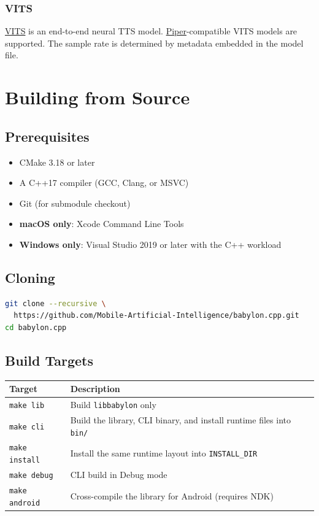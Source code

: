 \documentclass[12pt,a4paper]{article}
\begin{document}
\subsubsection{VITS}

\href{https://github.com/jaywalnut310/vits}{VITS} is an end-to-end neural TTS model. \href{https://github.com/rhasspy/piper}{Piper}-compatible VITS models are supported. The sample rate is determined by metadata embedded in the model file.

\section{Building from Source}
\label{sec:building}

\subsection{Prerequisites}

\begin{itemize}[noitemsep]
    \item CMake 3.18 or later
    \item A C++17 compiler (GCC, Clang, or MSVC)
    \item Git (for submodule checkout)
    \item \textbf{macOS only}: Xcode Command Line Tools
    \item \textbf{Windows only}: Visual Studio 2019 or later with the C++ workload
\end{itemize}

\subsection{Cloning}

\begin{lstlisting}[language=bash]
git clone --recursive \
  https://github.com/Mobile-Artificial-Intelligence/babylon.cpp.git
cd babylon.cpp
\end{lstlisting}

\subsection{Build Targets}

\begin{center}
\begin{tabular}{ll}
\toprule
\textbf{Target} & \textbf{Description} \\
\midrule
\texttt{make lib}     & Build \texttt{libbabylon} only \\
\texttt{make cli}     & Build the library, CLI binary, and install runtime files into \texttt{bin/} \\
\texttt{make install} & Install the same runtime layout into \texttt{INSTALL\_DIR} \\
\texttt{make debug}   & CLI build in Debug mode \\
\texttt{make android} & Cross-compile the library for Android (requires NDK) \\
\bottomrule
\end{tabular}
\end{center}
\end{document}
